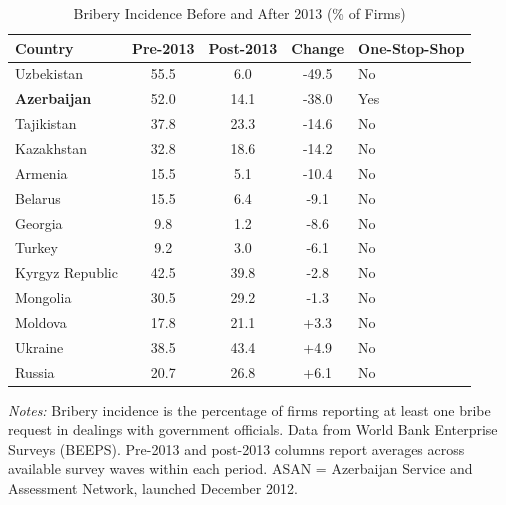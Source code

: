 \begin{table}[htbp]
\centering
\caption{Bribery Incidence Before and After 2013 (\% of Firms)}
\label{tab:bribery}
\begin{tabular}{lcccl}
\hline\hline
Country & Pre-2013 & Post-2013 & Change & One-Stop-Shop \\
\hline
Uzbekistan & 55.5 & 6.0 & -49.5 & No \\
\textbf{Azerbaijan} & 52.0 & 14.1 & -38.0 & Yes \\
Tajikistan & 37.8 & 23.3 & -14.6 & No \\
Kazakhstan & 32.8 & 18.6 & -14.2 & No \\
Armenia & 15.5 & 5.1 & -10.4 & No \\
Belarus & 15.5 & 6.4 & -9.1 & No \\
Georgia & 9.8 & 1.2 & -8.6 & No \\
Turkey & 9.2 & 3.0 & -6.1 & No \\
Kyrgyz Republic & 42.5 & 39.8 & -2.8 & No \\
Mongolia & 30.5 & 29.2 & -1.3 & No \\
Moldova & 17.8 & 21.1 & +3.3 & No \\
Ukraine & 38.5 & 43.4 & +4.9 & No \\
Russia & 20.7 & 26.8 & +6.1 & No \\
\hline\hline
\end{tabular}
\par\vspace{0.3em}
{\footnotesize \textit{Notes:} Bribery incidence is the percentage of firms reporting at least one bribe request in dealings with government officials. Data from World Bank Enterprise Surveys (BEEPS). Pre-2013 and post-2013 columns report averages across available survey waves within each period. ASAN = Azerbaijan Service and Assessment Network, launched December 2012.}
\end{table}
